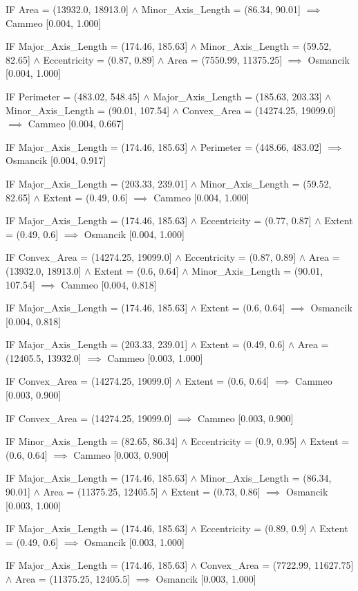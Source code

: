 IF Area = (13932.0, 18913.0] $\land$ Minor\_Axis\_Length = (86.34, 90.01] $\implies$ Cammeo [0.004, 1.000]

IF Major\_Axis\_Length = (174.46, 185.63] $\land$ Minor\_Axis\_Length = (59.52, 82.65] $\land$ Eccentricity = (0.87, 0.89] $\land$ Area = (7550.99, 11375.25] $\implies$ Osmancik [0.004, 1.000]

IF Perimeter = (483.02, 548.45] $\land$ Major\_Axis\_Length = (185.63, 203.33] $\land$ Minor\_Axis\_Length = (90.01, 107.54] $\land$ Convex\_Area = (14274.25, 19099.0] $\implies$ Cammeo [0.004, 0.667]

IF Major\_Axis\_Length = (174.46, 185.63] $\land$ Perimeter = (448.66, 483.02] $\implies$ Osmancik [0.004, 0.917]

IF Major\_Axis\_Length = (203.33, 239.01] $\land$ Minor\_Axis\_Length = (59.52, 82.65] $\land$ Extent = (0.49, 0.6] $\implies$ Cammeo [0.004, 1.000]

IF Major\_Axis\_Length = (174.46, 185.63] $\land$ Eccentricity = (0.77, 0.87] $\land$ Extent = (0.49, 0.6] $\implies$ Osmancik [0.004, 1.000]

IF Convex\_Area = (14274.25, 19099.0] $\land$ Eccentricity = (0.87, 0.89] $\land$ Area = (13932.0, 18913.0] $\land$ Extent = (0.6, 0.64] $\land$ Minor\_Axis\_Length = (90.01, 107.54] $\implies$ Cammeo [0.004, 0.818]

IF Major\_Axis\_Length = (174.46, 185.63] $\land$ Extent = (0.6, 0.64] $\implies$ Osmancik [0.004, 0.818]

IF Major\_Axis\_Length = (203.33, 239.01] $\land$ Extent = (0.49, 0.6] $\land$ Area = (12405.5, 13932.0] $\implies$ Cammeo [0.003, 1.000]

IF Convex\_Area = (14274.25, 19099.0] $\land$ Extent = (0.6, 0.64] $\implies$ Cammeo [0.003, 0.900]

IF Convex\_Area = (14274.25, 19099.0] $\implies$ Cammeo [0.003, 0.900]

IF Minor\_Axis\_Length = (82.65, 86.34] $\land$ Eccentricity = (0.9, 0.95] $\land$ Extent = (0.6, 0.64] $\implies$ Cammeo [0.003, 0.900]

IF Major\_Axis\_Length = (174.46, 185.63] $\land$ Minor\_Axis\_Length = (86.34, 90.01] $\land$ Area = (11375.25, 12405.5] $\land$ Extent = (0.73, 0.86] $\implies$ Osmancik [0.003, 1.000]

IF Major\_Axis\_Length = (174.46, 185.63] $\land$ Eccentricity = (0.89, 0.9] $\land$ Extent = (0.49, 0.6] $\implies$ Osmancik [0.003, 1.000]

IF Major\_Axis\_Length = (174.46, 185.63] $\land$ Convex\_Area = (7722.99, 11627.75] $\land$ Area = (11375.25, 12405.5] $\implies$ Osmancik [0.003, 1.000]

